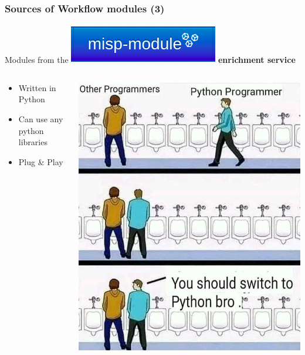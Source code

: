 \begin{frame}
    \frametitle{Sources of Workflow modules (3)}
    Modules from the \includegraphics[width=0.20\linewidth]{pictures/misp-module-icon.png} \textbf{enrichment service}
    \vspace*{0.5em}
    \begin{columns}
        \begin{column}{0.50\textwidth}
            \begin{itemize}
                \item Written in Python
                \item Can use any python libraries
                \item Plug \& Play
            \end{itemize}
        \end{column}
        \begin{column}{0.50\textwidth}
            \includegraphics[width=1.0\linewidth]{pictures/python-joke.png}
        \end{column}
    \end{columns}
\end{frame}

